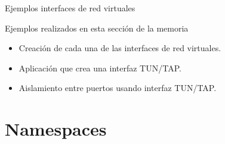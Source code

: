 \documentclass[aspectratio=169,xcolor=dvipsnames]{beamer}
\begin{document}
	\begin{frame}{Ejemplos interfaces de red virtuales}
	    \begin{alertblock}{Ejemplos realizados en esta sección de la memoria}
	        \begin{itemize}
	            \item Creación de cada una de las interfaces de red virtuales.
	            \item Aplicación que crea una interfaz TUN/TAP.
	            \item Aislamiento entre puertos usando interfaz TUN/TAP.
	        \end{itemize}
	    \end{alertblock}
	\end{frame}
	
	
	\section{Namespaces}
	
\end{document}
